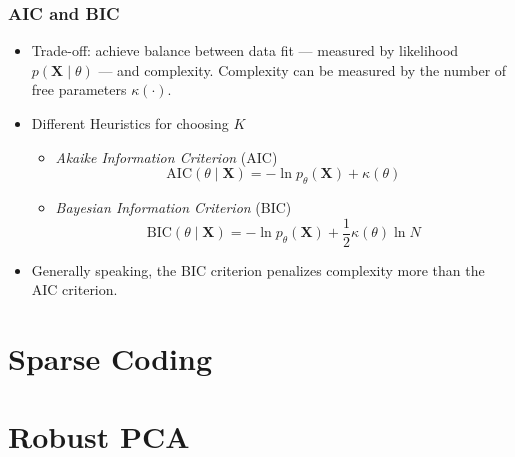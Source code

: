 \documentclass[conference,11pt]{IEEEtran}
\newcommand{\matr}[1]{\boldsymbol{\mathbf{#1}}}
\begin{document}
\subsubsection{AIC and BIC}
\begin{itemize}
  \item Trade-off: achieve balance between data fit --- measured by likelihood
    $p(\matr{X}\mid\theta)$ --- and complexity. Complexity can be measured by
    the number of free parameters $\kappa(\cdot)$.
  \item Different Heuristics for choosing $K$
    \begin{itemize}
      \item \emph{Akaike Information Criterion} (AIC)
        \[
          \mathrm{AIC}(\theta\mid\matr{X}) = -\ln p_{\theta}(\matr{X}) +
          \kappa(\theta)
        \]
      \item \emph{Bayesian Information Criterion} (BIC)
        \[
          \mathrm{BIC}(\theta\mid\matr{X}) = -\ln p_{\theta}(\matr{X}) +
          \frac{1}{2} \kappa(\theta) \ln N
        \]
    \end{itemize}
  \item Generally speaking, the BIC criterion penalizes complexity more than
    the AIC criterion.
\end{itemize}

\section{Sparse Coding}

\section{Robust PCA}
\end{document}

